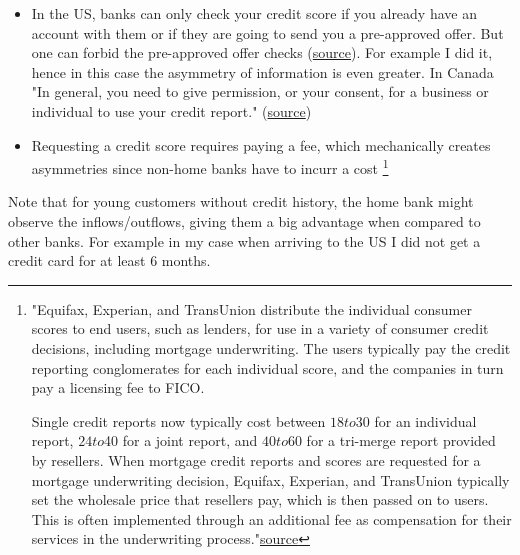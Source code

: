 \documentclass[12pt]{article}
\theoremstyle{plain}
\theoremstyle{plain}
\theoremstyle{definition}  %
\theoremstyle{remark}  %
\begin{document}
\begin{enumerate}
\begin{itemize}
... the banker must not only know what the transaction is which he is asked to  finance and how it is likely to turn out but he must also know the customer, his business and even his private habits, and get, by frequently "talking things over with him", a clear picture of the situation 
        
        \item In the US, banks can only check your credit score if you already have an account with them or if they are going to send you a pre-approved offer. But one can forbid the pre-approved offer checks (\href{https://www.experian.com/blogs/ask-experian/can-someone-run-a-credit-check-without-my-permission/}{source}). For example I did it, hence in this case the asymmetry of information is even greater. 
        In Canada "In general, you need to give permission, or your consent, for a business or individual to use your credit report." (\href{https://www.canada.ca/en/financial-consumer-agency/services/credit-reports-score/credit-report-score-basics.html}{source})
        \item Requesting a credit score requires paying a fee, which mechanically creates asymmetries since non-home banks have to incurr a cost \footnote{"Equifax, Experian, and TransUnion distribute the individual consumer scores to end users, such as lenders, for use in a variety of consumer credit decisions, including mortgage underwriting. The users typically pay the credit reporting conglomerates for each individual score, and the companies in turn pay a licensing fee to FICO.

Single credit reports now typically cost between $18 to $30 for an individual report, $24 to $40 for a joint report, and $40 to $60 for a tri-merge report provided by resellers. When mortgage credit reports and scores are requested for a mortgage underwriting decision, Equifax, Experian, and TransUnion typically set the wholesale price that resellers pay, which is then passed on to users. This is often implemented through an additional fee as compensation for their services in the underwriting process."\href{https://www.consumerfinance.gov/about-us/newsroom/prepared-remarks-of-cfpb-director-rohit-chopra-at-the-mortgage-bankers-association/}{source}}

    \end{itemize}

    Note that for young customers without credit history, the home bank might observe the inflows/outflows, giving them a big advantage when compared to other banks. For example in my case when arriving to the US I did not get a credit card for at least 6 months. 


\end{enumerate}
\end{document}
